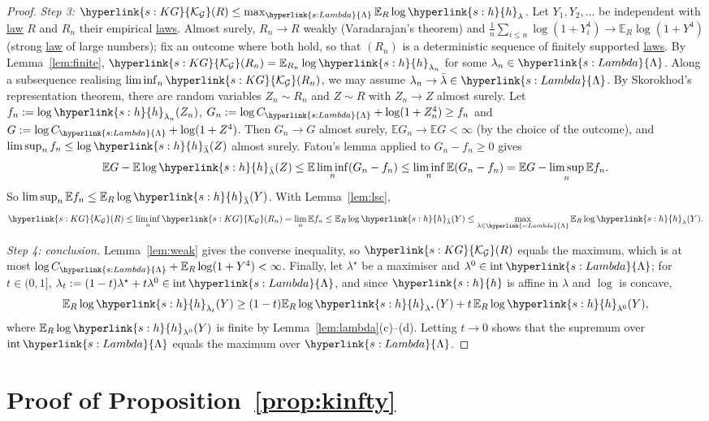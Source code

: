 \documentclass[11pt]{article}
\newcommand{\E}{\mathbb{E}}
\newcommand{\sy}[2]{{\hyperlink{#1}{#2}}}
\newcommand{\term}[2]{\hyperlink{#1}{#2}}
\newcommand{\KG}{\sy{s:KG}{\mathcal{K}_{\mathcal{G}}}}
\newcommand{\hl}{\sy{s:h}{h}}
\newcommand{\Lam}{\sy{s:Lambda}{\Lambda}}
\begin{document}
\begin{proof}
\emph{Step 3: $\KG(R)\le\max_\Lam\E_R\log\hl_\lambda$.} Let $Y_1,Y_2,\dots$ be independent with \term{w:law}{law} $R$ and $R_n$ their empirical
\term{w:law}{laws}. Almost surely, $R_n\to R$ weakly (Varadarajan's theorem) and $\frac1n\sum_{i\le n}\log(1+Y_i^4)\to\E_R\log(1+Y^4)$ (strong
\term{w:law}{law} of large numbers); fix an outcome where both hold, so that $(R_n)$ is a deterministic sequence of finitely
supported \term{w:law}{laws}. By Lemma~\ref{lem:finite}, $\KG(R_n)=\E_{R_n}\log\hl_{\lambda_n}$ for some $\lambda_n\in\Lam$. Along a subsequence realising
$\liminf_n\KG(R_n)$, we may assume $\lambda_n\to\bar\lambda\in\Lam$. By Skorokhod's representation theorem, there are random
variables $Z_n\sim R_n$ and $Z\sim R$ with $Z_n\to Z$ almost surely. Let $f_n:=\log\hl_{\lambda_n}(Z_n)$,
$G_n:=\log C_\Lam+\log(1+Z_n^4)\ge f_n$ and $G:=\log C_\Lam+\log(1+Z^4)$. Then $G_n\to G$ almost surely, $\E G_n\to\E G<\infty$
(by the choice of the outcome), and $\limsup_nf_n\le\log\hl_{\bar\lambda}(Z)$ almost surely. Fatou's lemma applied to
$G_n-f_n\ge0$ gives
\begin{equation*}
  \E G-\E\log\hl_{\bar\lambda}(Z)\le\E\liminf_n(G_n-f_n)\le\liminf_n\E(G_n-f_n)=\E G-\limsup_n\E f_n .
\end{equation*}
So $\limsup_n\E f_n\le\E_R\log\hl_{\bar\lambda}(Y)$. With Lemma~\ref{lem:lsc},
\begin{equation*}
  \KG(R)\le\liminf_n\KG(R_n)=\lim_n\E f_n\le\E_R\log\hl_{\bar\lambda}(Y)\le\max_{\lambda\in\Lam}\E_R\log\hl_\lambda(Y).
\end{equation*}

\emph{Step 4: conclusion.} Lemma~\ref{lem:weak} gives the converse inequality, so $\KG(R)$ equals the maximum, which
is at most $\log C_\Lam+\E_R\log(1+Y^4)<\infty$. Finally, let $\lambda^\star$ be a maximiser and $\lambda^0\in\mathrm{int}\,\Lam$; for
$t\in(0,1]$, $\lambda_t:=(1-t)\lambda^\star+t\lambda^0\in\mathrm{int}\,\Lam$, and since $\hl$ is affine in $\lambda$ and $\log$ is concave,
\begin{equation*}
  \E_R\log\hl_{\lambda_t}(Y)\ge(1-t)\E_R\log\hl_{\lambda^\star}(Y)+t\,\E_R\log\hl_{\lambda^0}(Y),
\end{equation*}
where $\E_R\log\hl_{\lambda^0}(Y)$ is finite by Lemma~\ref{lem:lambda}(c)--(d). Letting $t\to0$ shows that the supremum over
$\mathrm{int}\,\Lam$ equals the maximum over $\Lam$.
\end{proof}

\section{\texorpdfstring{Proof of Proposition~\ref{prop:kinfty}}{Proof of Proposition 4.3}}\label{sec:proof-kinfty}
\end{document}
